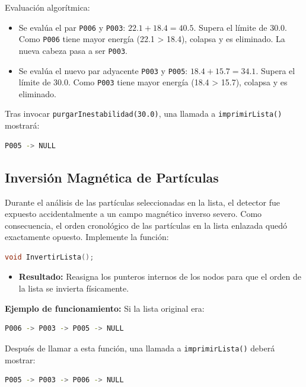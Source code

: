 \documentclass[11pt, letterpaper]{article}
\begin{document}
Evaluación algorítmica:
\begin{itemize}[noitemsep, topsep=0pt]
    \item Se evalúa el par \texttt{P006} y \texttt{P003}: $22.1 + 18.4 = 40.5$. Supera el límite de 30.0. Como \texttt{P006} tiene mayor energía (22.1 > 18.4), colapsa y es eliminado. La nueva cabeza pasa a ser \texttt{P003}.
    \item Se evalúa el nuevo par adyacente \texttt{P003} y \texttt{P005}: $18.4 + 15.7 = 34.1$. Supera el límite de 30.0. Como \texttt{P003} tiene mayor energía (18.4 > 15.7), colapsa y es eliminado.
\end{itemize}

Tras invocar \texttt{purgarInestabilidad(30.0)}, una llamada a \texttt{imprimirLista()} mostrará:
\begin{lstlisting}[language=bash]
P005 -> NULL
\end{lstlisting}

\subsection{Inversión Magnética de Partículas}
Durante el análisis de las partículas seleccionadas en la lista, el detector fue expuesto accidentalmente a un campo magnético inverso severo. Como consecuencia, el orden cronológico de las partículas en la lista enlazada quedó exactamente opuesto. Implemente la función:
\begin{lstlisting}[language=C++]
void InvertirLista();
\end{lstlisting}
\begin{itemize}[noitemsep, topsep=0pt]
    \item \textbf{Resultado:} Reasigna los punteros internos de los nodos para que el orden de la lista se invierta físicamente.
\end{itemize}

\textbf{Ejemplo de funcionamiento:}
Si la lista original era:
\begin{lstlisting}[language=bash]
P006 -> P003 -> P005 -> NULL
\end{lstlisting}

Después de llamar a esta función, una llamada a \texttt{imprimirLista()} deberá mostrar:
\begin{lstlisting}[language=bash]
P005 -> P003 -> P006 -> NULL
\end{lstlisting}
\end{document}
